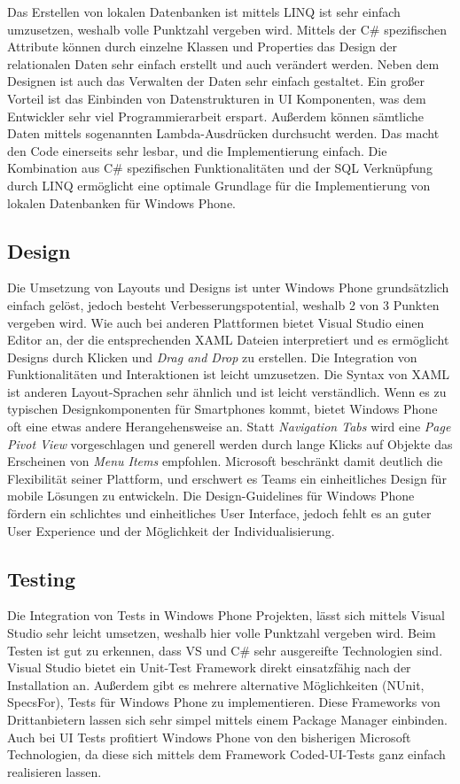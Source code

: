 Das Erstellen von lokalen Datenbanken ist mittels LINQ ist sehr einfach umzusetzen, weshalb volle Punktzahl vergeben wird. Mittels der C\# spezifischen Attribute können durch einzelne Klassen und Properties das Design der relationalen Daten sehr einfach erstellt und auch verändert werden. Neben dem Designen ist auch das Verwalten der Daten sehr einfach gestaltet. Ein großer Vorteil ist das Einbinden von Datenstrukturen in UI Komponenten, was dem Entwickler sehr viel Programmierarbeit erspart. Außerdem können sämtliche Daten mittels sogenannten Lambda-Ausdrücken durchsucht werden. Das macht den Code einerseits sehr lesbar, und die Implementierung einfach. Die Kombination aus C\# spezifischen Funktionalitäten und der SQL Verknüpfung durch LINQ ermöglicht eine optimale Grundlage für die Implementierung von lokalen Datenbanken für Windows Phone. 

\subsection{Design}

Die Umsetzung von Layouts und Designs ist unter Windows Phone grundsätzlich einfach gelöst, jedoch besteht Verbesserungspotential, weshalb 2 von 3 Punkten vergeben wird. Wie auch bei anderen Plattformen bietet Visual Studio einen Editor an, der die entsprechenden XAML Dateien interpretiert und es ermöglicht Designs durch Klicken und \textit{Drag and Drop} zu erstellen. Die Integration von Funktionalitäten und Interaktionen ist leicht umzusetzen. Die Syntax von XAML ist anderen Layout-Sprachen sehr ähnlich und ist leicht verständlich. Wenn es zu typischen Designkomponenten für Smartphones kommt, bietet Windows Phone oft eine etwas andere Herangehensweise an. Statt \textit{Navigation Tabs} wird eine \textit{Page Pivot View} vorgeschlagen und generell werden durch lange Klicks auf Objekte das Erscheinen von \textit{Menu Items} empfohlen. Microsoft beschränkt damit deutlich die Flexibilität seiner Plattform, und erschwert es Teams ein einheitliches Design für mobile Lösungen zu entwickeln. Die Design-Guidelines für Windows Phone fördern ein schlichtes und einheitliches User Interface, jedoch fehlt es an guter User Experience und der Möglichkeit der Individualisierung.

\subsection{Testing}

Die Integration von Tests in Windows Phone Projekten, lässt  sich mittels Visual Studio sehr leicht umsetzen, weshalb hier volle Punktzahl vergeben wird. Beim Testen ist gut zu erkennen, dass VS und C\# sehr ausgereifte Technologien sind. Visual Studio bietet ein Unit-Test Framework direkt einsatzfähig nach der Installation an. Außerdem gibt es mehrere alternative Möglichkeiten (NUnit, SpecsFor), Tests für Windows Phone zu implementieren. Diese Frameworks von Drittanbietern lassen sich sehr simpel mittels einem Package Manager einbinden. Auch bei UI Tests profitiert Windows Phone von den bisherigen Microsoft Technologien, da diese sich mittels dem Framework Coded-UI-Tests ganz einfach realisieren lassen. 

